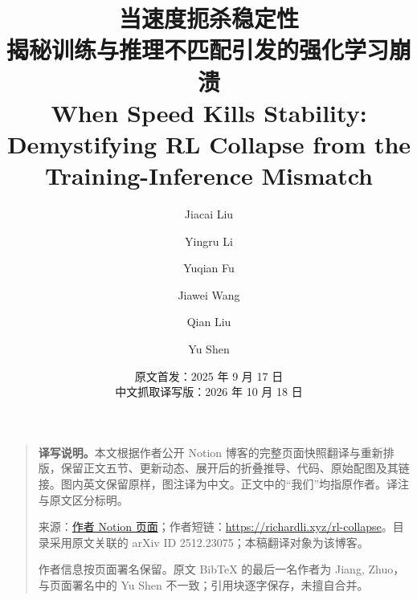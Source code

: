 \documentclass[UTF8,a4paper,11pt,fontset=none]{ctexart}
\title{\bfseries 当速度扼杀稳定性\\[0.4em]\Large 揭秘训练与推理不匹配引发的强化学习崩溃\\[0.5em]\large When Speed Kills Stability:\\Demystifying RL Collapse from the Training-Inference Mismatch}
\author{Jiacai Liu \and Yingru Li \and Yuqian Fu \and Jiawei Wang \and Qian Liu \and Yu Shen}
\date{原文首发：2025 年 9 月 17 日\\中文抓取译写版：2026 年 10 月 18 日}
\begin{document}
\maketitle
\begin{quote}\small
\textbf{译写说明。}本文根据作者公开 Notion 博客的完整页面快照翻译与重新排版，保留正文五节、更新动态、展开后的折叠推导、代码、原始配图及其链接。图内英文保留原样，图注译为中文。正文中的“我们”均指原作者。译注与原文区分标明。

来源：\href{https://yingru.notion.site/When-Speed-Kills-Stability-Demystifying-RL-Collapse-from-the-Training-Inference-Mismatch-271211a558b7808d8b12d403fd15edda}{作者 Notion 页面}；作者短链：\url{https://richardli.xyz/rl-collapse}。目录采用原文关联的 arXiv ID 2512.23075；本稿翻译对象为该博客。

作者信息按页面署名保留。原文 BibTeX 的最后一名作者为 Jiang, Zhuo，与页面署名中的 Yu Shen 不一致；引用块逐字保存，未擅自合并。
\end{quote}
\clearpage
\tableofcontents
\clearpage






\end{document}
